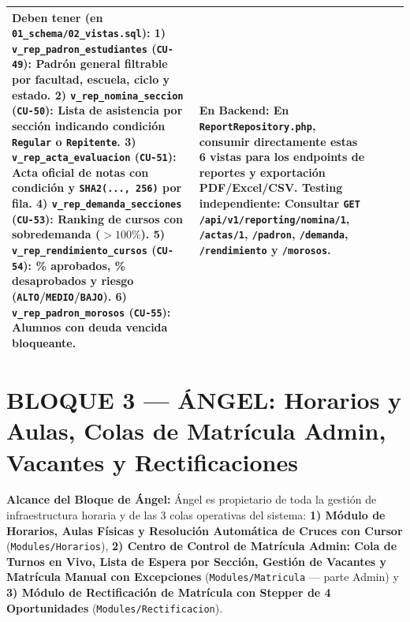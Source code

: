 \documentclass[10pt,a4paper,landscape]{article}
\begin{document}
\begin{longtable}{|p{0.5cm}|p{3.8cm}|p{2.9cm}|p{8.8cm}|p{9.2cm}|}
\textbf{Deben tener (en \texttt{01\_schema/02\_vistas.sql}):}
1) \texttt{v\_rep\_padron\_estudiantes} (\texttt{CU-49}): Padrón general filtrable por facultad, escuela, ciclo y estado.
2) \texttt{v\_rep\_nomina\_seccion} (\texttt{CU-50}): Lista de asistencia por sección indicando condición \texttt{Regular} o \texttt{Repitente}.
3) \texttt{v\_rep\_acta\_evaluacion} (\texttt{CU-51}): Acta oficial de notas con condición y \texttt{SHA2(..., 256)} por fila.
4) \texttt{v\_rep\_demanda\_secciones} (\texttt{CU-53}): Ranking de cursos con sobredemanda ($>100\%$).
5) \texttt{v\_rep\_rendimiento\_cursos} (\texttt{CU-54}): \% aprobados, \% desaprobados y riesgo (\texttt{ALTO}/\texttt{MEDIO}/\texttt{BAJO}).
6) \texttt{v\_rep\_padron\_morosos} (\texttt{CU-55}): Alumnos con deuda vencida bloqueante. & 
\textbf{En Backend:} En \texttt{ReportRepository.php}, consumir directamente estas 6 vistas para los endpoints de reportes y exportación PDF/Excel/CSV.\newline
\textbf{Testing independiente:} Consultar \texttt{GET /api/v1/reporting/nomina/1}, \texttt{/actas/1}, \texttt{/padron}, \texttt{/demanda}, \texttt{/rendimiento} y \texttt{/morosos}. \\
\hline

\end{longtable}
\normalsize

\newpage

\section{BLOQUE 3 — ÁNGEL: Horarios y Aulas, Colas de Matrícula Admin, Vacantes y Rectificaciones}

\textbf{Alcance del Bloque de Ángel:} Ángel es propietario de toda la gestión de infraestructura horaria y de las 3 colas operativas del sistema: \textbf{1) Módulo de Horarios, Aulas Físicas y Resolución Automática de Cruces con Cursor} (\texttt{Modules/Horarios}), \textbf{2) Centro de Control de Matrícula Admin: Cola de Turnos en Vivo, Lista de Espera por Sección, Gestión de Vacantes y Matrícula Manual con Excepciones} (\texttt{Modules/Matricula} — parte Admin) y \textbf{3) Módulo de Rectificación de Matrícula con Stepper de 4 Oportunidades} (\texttt{Modules/Rectificacion}).

\renewcommand{\arraystretch}{1.32}
\setlength{\LTleft}{0pt}
\setlength{\LTright}{0pt}
\end{document}
